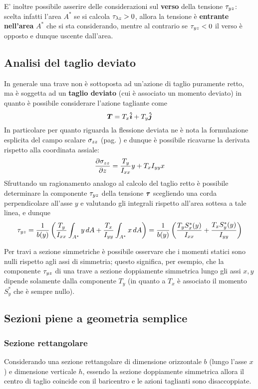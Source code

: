 		
		E' inoltre possibile asserire delle considerazioni sul \textbf{verso} della tensione $\tau_{yz}$: scelta infatti l'area $A^*$ se si calcola $\tau_{\lambda z} > 0$, allora la tensione è \textbf{entrante nell'area} $A^*$ che si sta considerando, mentre al contrario se $\tau_{yz} < 0$ il verso è opposto e dunque uscente dall'area.
		
	\subsection{Analisi del taglio deviato}
		In generale una trave non è sottoposta ad un'azione di taglio puramente retto, ma è soggetta ad un \textbf{taglio deviato} (cui è associato un momento deviato) in quanto è possibile considerare l'azione tagliante come
		\[\boldsymbol{T} = T_x\boldsymbol{\hat{i}} + T_y \boldsymbol{\hat{j}}\]
		In particolare per quanto riguarda la flessione deviata ne è nota la formulazione esplicita del campo scalare $\sigma_{zz}$ (pag. \pageref{sec:fless:deviata}) e dunque è possibile ricavarne la derivata rispetto alla coordinata assiale:
		\[ \frac{\partial \sigma_{zz}}{\partial z} = \frac {T_y} {I_{xx}} y + T_x I_{yy} x \]
		Sfruttando un ragionamento analogo al calcolo del taglio retto è possibile determinare la componente $\tau_{yz}$ della tensione $\boldsymbol{\tau}$ scegliendo una corda perpendicolare all'asse $y$ e valutando gli integrali rispetto all'area sottesa a tale linea, e dunque
		\begin{equation} \label{eq:taglio:deviato}
			\tau_{yz} = \frac 1 {b(y)} \left(\frac {T_y} {I_{xx}} \int_{A^*} y\, dA + \frac {T_x} {I_{yy}} \int_{A^*} x\, dA\right) = \frac 1  {b(y)} \left(\frac{T_y S_x^*(y)}{I_{xx}} + \frac{T_x S_y^*(y)}{I_{yy}} \right)
		\end{equation}
		\begin{nota}
			Per travi a sezione simmetriche è possibile osservare che i momenti statici sono nulli rispetto agli assi di simmetria; questo significa, per esempio, che la componente $\tau_{yz}$ di una trave a sezione doppiamente simmetrica lungo gli assi $x,y$ dipende solamente dalla componente $T_y$ (in quanto a $T_x$ è associato il momento $S_y^*$ che è sempre nullo).
		\end{nota}
		
	\subsection{Sezioni piene a geometria semplice}
	\subsubsection{Sezione rettangolare}
		Considerando una sezione rettangolare di dimensione orizzontale $b$ (lungo l'asse $x$) e dimensione verticale $h$, essendo la sezione doppiamente simmetrica allora il centro di taglio coincide con il baricentro e le azioni taglianti sono disaccoppiate.
		
